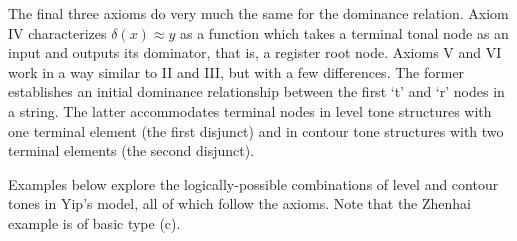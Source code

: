 \documentclass{article}
\newcommand{\ap}{\approx}
\begin{document}
The final three axioms do very much the same for the dominance relation. Axiom IV characterizes $\delta(x)\ap y$ as a function which takes a terminal tonal node as an input and outputs its dominator, that is, a register root node. Axioms V and VI work in a way similar to II and III, but with a few differences. The former establishes an initial dominance relationship between the first `t' and `r' nodes in a string. The latter accommodates terminal nodes in level tone structures with one terminal element (the first disjunct) and in contour tone structures with two terminal elements (the second disjunct). \par
Examples below explore the logically-possible combinations of level and contour tones in Yip's model, all of which follow the axioms. Note that the Zhenhai example is of basic type (c). \\
\hspace{1em}
\end{document}
